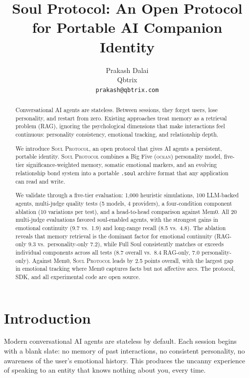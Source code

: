 \documentclass{article}
\title{Soul Protocol: An Open Protocol for Portable AI Companion Identity}
\author{
  Prakash Dalai \\
  Qbtrix \\
  \texttt{prakash@qbtrix.com} \\
}
\newcommand{\soul}{\textsc{Soul Protocol}}
\newcommand{\ocean}{\textsc{ocean}}
\newcommand{\soulfile}{\texttt{.soul}}
\begin{document}
\maketitle

\begin{abstract}
Conversational AI agents are stateless. Between sessions, they forget users, lose personality, and restart from zero. Existing approaches treat memory as a retrieval problem (RAG), ignoring the psychological dimensions that make interactions feel continuous: personality consistency, emotional tracking, and relationship depth.

We introduce \soul{}, an open protocol that gives AI agents a persistent, portable identity. \soul{} combines a Big Five (\ocean{}) personality model, five-tier significance-weighted memory, somatic emotional markers, and an evolving relationship bond system into a portable \soulfile{} archive format that any application can read and write.

We validate through a five-tier evaluation: 1,000 heuristic simulations, 100 LLM-backed agents, multi-judge quality tests (5 models, 4 providers), a four-condition component ablation (10 variations per test), and a head-to-head comparison against Mem0. All 20 multi-judge evaluations favored soul-enabled agents, with the strongest gains in emotional continuity (9.7 vs.\ 1.9) and long-range recall (8.5 vs.\ 4.8). The ablation reveals that memory retrieval is the dominant factor for emotional continuity (RAG-only 9.3 vs.\ personality-only 7.2), while Full Soul consistently matches or exceeds individual components across all tests (8.7 overall vs.\ 8.4 RAG-only, 7.0 personality-only). Against Mem0, \soul{} leads by 2.5 points overall, with the largest gap in emotional tracking where Mem0 captures facts but not affective arcs. The protocol, SDK, and all experimental code are open source.
\end{abstract}

\section{Introduction}
\label{sec:intro}

Modern conversational AI agents are stateless by default. Each session begins with a blank slate: no memory of past interactions, no consistent personality, no awareness of the user's emotional history. This produces the uncanny experience of speaking to an entity that knows nothing about you, every time.
\end{document}
